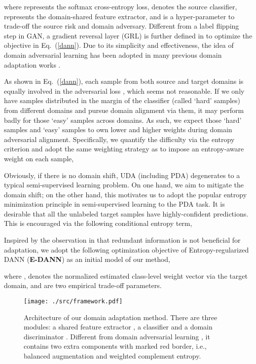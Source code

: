 \documentclass[runningheads]{llncs}
\begin{document}
where  represents the softmax cross-entropy loss,  denotes the source classifier,  represents the domain-shared feature extractor, and  is a hyper-parameter to trade-off the source risk and domain adversary.
Different from a label flipping step in GAN, a gradient reversal layer (GRL) is further defined in \cite{ganin2015unsupervised} to optimize the objective in Eq.~(\ref{dann}). 
Due to its simplicity and effectiveness, the idea of domain adversarial learning has been adopted in many previous domain adaptation works \cite{liu2016coupled,tzeng2017adversarial,long2018conditional}.
	
	
As shown in Eq.~(\ref{dann}), each sample from both source and target domains is equally involved in the adversarial loss , which seems not reasonable.
If we only have samples distributed in the margin of the classifier (called `hard' samples) from different domains and pursue domain alignment via them, it may perform badly for those `easy' samples across domains.
As such, we expect those `hard' samples and `easy' samples to own lower and higher weights during domain adversarial alignment.
Specifically, we quantify the difficulty via the entropy criterion  and adopt the same weighting strategy as \cite{long2018conditional} to impose an entropy-aware weight  on each sample,



Obviously, if there is no domain shift, UDA (including PDA) degenerates to a typical semi-supervised learning problem.
On one hand, we aim to mitigate the domain shift; on the other hand, this motivates us to adopt the popular entropy minimization principle \cite{grandvalet2005semi} in semi-supervised learning to the PDA task.
It is desirable that all the unlabeled target samples have highly-confident predictions. This is encouraged via the following conditional entropy term,

Inspired by the observation in \cite{cao2018partialb} that redundant information is not beneficial for adaptation, we adopt the following optimization objective of Entropy-regularized DANN (\textbf{E-DANN}) as an initial model of our method,

where ,  denotes the normalized estimated class-level weight vector via the target domain, and  are two empirical trade-off parameters.
	
\begin{figure*}[t]
	\centering
	\texttt{[image: ./src/framework.pdf]}
	\caption{Architecture of our domain adaptation method. There are three modules: a shared feature extractor , a classifier  and a domain discriminator . Different from domain adversarial learning \cite{ganin2015unsupervised}, it contains two extra components with marked red border, i.e., balanced augmentation and weighted complement entropy.}
	\label{fig:framework}
\end{figure*}
	
\end{document}
